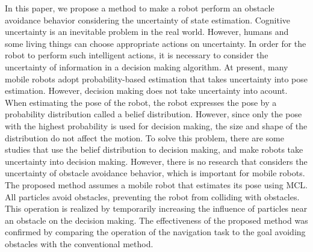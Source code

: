 \begin{eabstract}
In this paper, we propose a method to make a robot perform an obstacle avoidance behavior considering the uncertainty of state estimation.
Cognitive uncertainty is an inevitable problem in the real world.
However, humans and some living things can choose appropriate actions on uncertainty.
In order for the robot to perform such intelligent actions, it is necessary to consider the uncertainty of information in a decision making algorithm.
At present, many mobile robots adopt probability-based estimation that takes uncertainty into pose estimation.
However, decision making does not take uncertainty into acount.
When estimating the pose of the robot, the robot expresses the pose by a probability distribution called a belief distribution.
However, since only the pose with the highest probability is used for decision making, the size and shape of the distribution do not affect the motion.
To solve this problem, there are some studies that use the belief distribution to decision making, and make robots take uncertainty into decision making.
However, there is no research that considers the uncertainty of obstacle avoidance behavior, which is important for mobile robots.
The proposed method assumes a mobile robot that estimates its pose using MCL.
All particles avoid obstacles, preventing the robot from colliding with obstacles.
This operation is realized by temporarily increasing the influence of particles near an obstacle on the decision making.
The effectiveness of the proposed method was confirmed by comparing the operation of the navigation task to the goal avoiding obstacles with the conventional method.
\end{eabstract}


